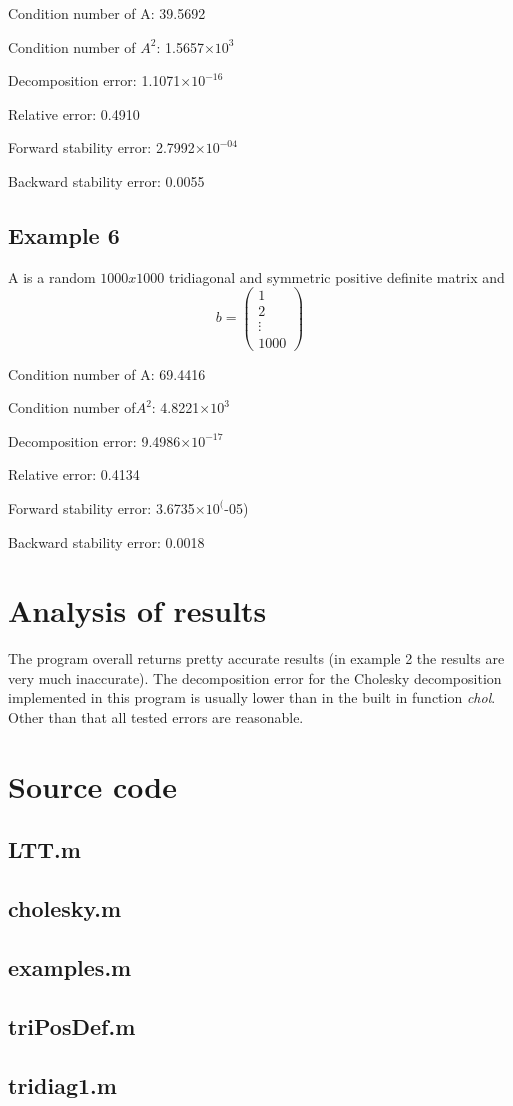 \documentclass[12pt]{article}
\providecommand{\e}[1]{\ensuremath{\times 10^{#1}}}
\begin{document}
Condition number of A: 
   39.5692

Condition number of $A^2$: 
   1.5657\e3

Decomposition error:
   1.1071\e{-16}

Relative error:
    0.4910

Forward stability error:
    2.7992\e{-04}

Backward stability error:
    0.0055

\subsection{Example 6}
A is a random $1000x1000$ tridiagonal and symmetric positive definite matrix and $$b=\left(\begin{array}{c} 1\\ 2\\ \vdots\\ 1000 \end{array}\right)$$ 

Condition number of A: 
   69.4416

Condition number of$ A^2$: 
   4.8221\e3

Decomposition error:
   9.4986\e{-17}

Relative error:
    0.4134

Forward stability error:
    3.6735\e(-05)

Backward stability error:
    0.0018

\section{Analysis of results}
The program overall returns pretty accurate results (in example 2 the results are very much inaccurate). The decomposition error for the Cholesky decomposition implemented in this program is usually lower than in the built in function \textit{chol}. Other than that all tested errors are reasonable. 

\section{Source code}
\subsection{LTT.m}


\subsection{cholesky.m}


\subsection{examples.m}


\subsection{triPosDef.m}


\subsection{tridiag1.m}


\end{document}
